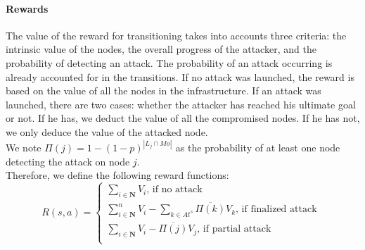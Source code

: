 \paragraph{Rewards}

The value of the reward for transitioning takes into accounts three criteria: the intrinsic value of the nodes, the overall progress of the attacker, and the probability of detecting an attack. The probability of an attack occurring is already accounted for in the transitions.
If no attack was launched, the reward is based on the value of all the nodes in the infrastructure. 
If an attack was launched, there are two cases: whether the attacker has reached his ultimate goal or not.
If he has, we deduct the value of all the compromised nodes. If he has not, we only deduce the value of the attacked node.
\\We note $\Pi(j)=1 - (1-p)^{|L_j \cap Mo|}$ as the probability of at least one node detecting the attack on node $j$.
\\
Therefore, we define the following reward functions: %
\\
\begin{equation}
  R(s,a) =\begin{cases}
    \sum\limits_{i\in \textbf{N}} V_i \text{, if no attack}\\
    \sum\limits_{i\in \textbf{N}}^n V_i - \sum\limits_{k \in At^s} \overline{\Pi(k)}V_k \text{, if finalized attack }\\
    \sum\limits_{i\in \textbf{N}} V_i - \overline{\Pi(j)}V_j \text{, if partial attack}\\
  \end{cases}
\end{equation}